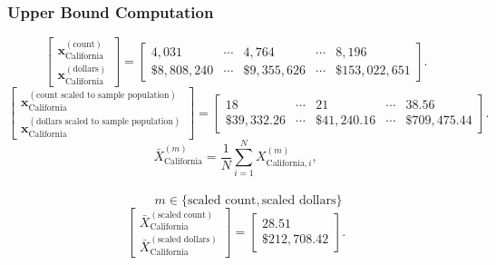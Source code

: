 \subsubsection{Upper Bound Computation}
\[
\begin{bmatrix}
\mathbf{x}_{\text{California}}^{(\text{count})}\\
\mathbf{x}_{\text{California}}^{(\text{dollars})}
\end{bmatrix}
=
\begin{bmatrix}
4{,}031 & \cdots & 4{,}764 & \cdots & 8{,}196\\
\$8{,}808{,}240 & \cdots & \$9{,}355{,}626 & \cdots & \$153{,}022{,}651
\end{bmatrix}.
\]
\[
\begin{bmatrix}
\mathbf{x}_{\text{California}}^{(\text{count scaled to sample population})}\\
\mathbf{x}_{\text{California}}^{(\text{dollars scaled to sample population})}
\end{bmatrix}
=
\begin{bmatrix}
18 & \cdots & 21 & \cdots & 38.56\\
\$39{,}332.26 & \cdots & \$41{,}240.16 & \cdots & \$709{,}475.44
\end{bmatrix}.
\]
\[
\bar{X}_{\text{California}}^{(m)}
= \frac{1}{N}\sum_{i=1}^{N} X_{\text{California},i}^{(m)},
\]
\\
\[
\qquad
m \in \{\text{scaled count},\text{scaled dollars}\}
\]
\[
\begin{bmatrix}
\bar{X}_{\text{California}}^{(\text{scaled count})}\\
\bar{X}_{\text{California}}^{(\text{scaled dollars})}
\end{bmatrix}
=
\begin{bmatrix}
28.51\\
\$212{,}708.42
\end{bmatrix}.
\]
